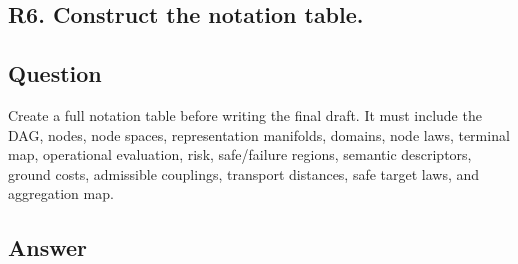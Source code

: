 \documentclass[11pt,a4paper]{article}
\begin{document}
\begin{landscape}
\normalsize
\section*{R6. Construct the notation table.}

\subsection*{Question}

Create a full notation table before writing the final draft. It must include the DAG, nodes, node spaces, representation manifolds, domains, node laws, terminal map, operational evaluation, risk, safe/failure regions, semantic descriptors, ground costs, admissible couplings, transport distances, safe target laws, and aggregation map.

\subsection*{Answer}


\end{landscape}
\end{document}

